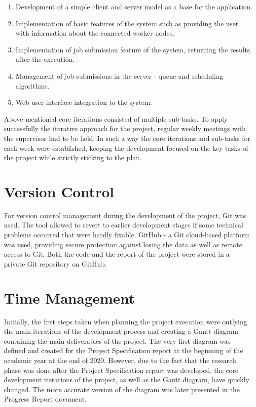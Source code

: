 \documentclass[10pt]{report}
\begin{document}
\begin{enumerate}
    \item Development of a simple client and server model as a base for the application.
    \item Implementation of basic features of the system such as providing the user with information about the connected worker nodes.
    \item Implementation of job submission feature of the system, returning the results after the execution.
    \item Management of job submissions in the server - queue and scheduling algorithms.
    \item Web user interface integration to the system.
\end{enumerate}

Above mentioned core iterations consisted of multiple sub-tasks. To apply successfully the iterative approach for the project, regular weekly meetings with the supervisor had to be held. In such a way the core iterations and sub-tasks for each week were established, keeping the development focused on the key tasks of the project while strictly sticking to the plan.

\section{Version Control}

For version control management during the development of the project, Git was used. The tool allowed to revert to earlier development stages if some technical problems occurred that were hardly fixable. GitHub - a Git cloud-based platform was used, providing secure protection against losing the data as well as remote access to Git. Both the code and the report of the project were stored in a private Git repository on GitHub.

\section{Time Management}

Initially, the first steps taken when planning the project execution were outlying the main iterations of the development process and creating a Gantt diagram containing the main deliverables of the project. The very first diagram was defined and created for the Project Specification report at the beginning of the academic year at the end of 2020. However, due to the fact that the research phase was done after the Project Specification report was developed, the core development iterations of the project, as well as the Gantt diagram, have quickly changed. The more accurate version of the diagram was later presented in the Progress Report document.
\newline
\end{document}
